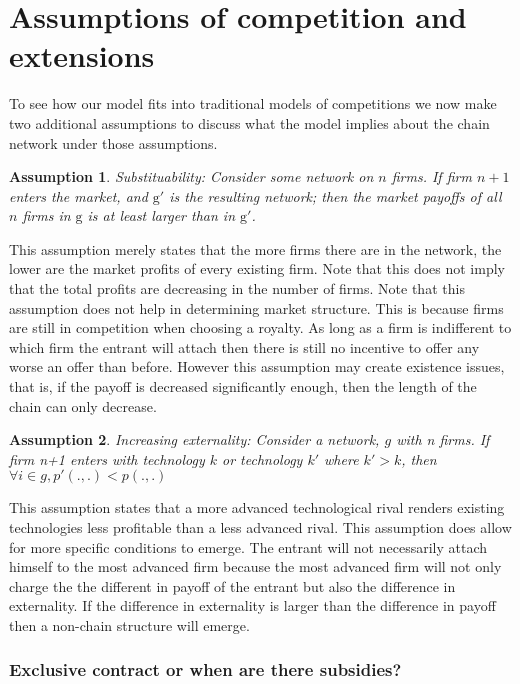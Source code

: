 \documentclass{article}
\newtheorem{assumption}{Assumption}
\begin{document}
\section{Assumptions of competition and extensions}

To see how our model fits into traditional models of competitions we now make two additional assumptions to discuss what the model implies about the chain network under those assumptions.  

\begin{assumption}{Substituability:}
Consider some network  on $n$ firms. If firm $n+1$ enters the market, and $\text{g}'$ is the resulting network; then the market payoffs of all $n$ firms in $\text{g}$ is at least larger than in $\text{g}'$.
\end{assumption}

This assumption merely states that the more firms there are in the network, the lower are the market profits of every existing firm. Note that this does not imply that the total profits are decreasing in the number of firms. Note that this assumption does not help in determining market structure. This is because firms are still in competition when choosing a royalty. As long as a firm is indifferent to which firm the entrant will attach then there is still no incentive to offer any worse an offer than before. However this assumption may create existence issues, that is, if the payoff is decreased significantly enough, then the length of the chain can only decrease.  

\begin{assumption}{Increasing externality:}
Consider a network, $g$ with n firms. If firm n+1 enters with technology $k$ or technology $k'$ where $k'>k$, then $\forall i \in g, p'(.,.)<p(.,.)$
\end{assumption}

This assumption states that a more advanced technological rival renders existing technologies less profitable than a less advanced rival. This assumption does allow for more specific conditions to emerge. The entrant will not necessarily attach himself to the most advanced firm because the most advanced firm will not only charge the the different in payoff of the entrant but also the difference in externality. If the difference in externality is larger than the difference in payoff then a non-chain structure will emerge.

\subsubsection{Exclusive contract or when are there subsidies?}
\end{document}
